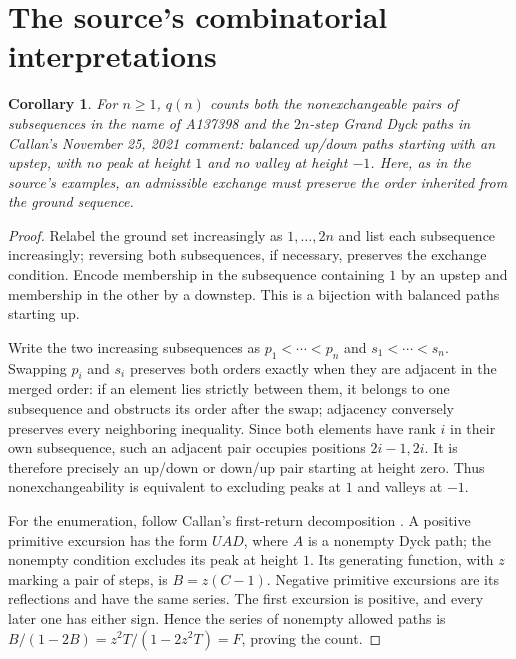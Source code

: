 \documentclass[11pt]{article}
\newtheorem{corollary}[theorem]{Corollary}
\begin{document}
\section{The source's combinatorial interpretations}
\begin{corollary}\label{paths}
For $n\geq1$, $q(n)$ counts both the nonexchangeable pairs of
subsequences in the name of A137398 and the $2n$-step Grand Dyck paths
in Callan's November 25, 2021 comment: balanced up/down paths starting
with an upstep, with no peak at height $1$ and no valley at height $-1$.
Here, as in the source's examples, an admissible exchange must preserve
the order inherited from the ground sequence.
\end{corollary}
\begin{proof}
Relabel the ground set increasingly as $1,\ldots,2n$ and list each
subsequence increasingly; reversing both subsequences, if necessary,
preserves the exchange condition. Encode membership in the subsequence
containing $1$ by an upstep and membership in the other by a downstep.
This is a bijection with balanced paths starting up.

Write the two increasing subsequences as $p_1<\cdots<p_n$ and
$s_1<\cdots<s_n$. Swapping $p_i$ and $s_i$ preserves both orders
exactly when they are adjacent in the merged order: if an element lies
strictly between them, it belongs to one subsequence and obstructs its
order after the swap; adjacency conversely preserves every neighboring
inequality. Since both elements have rank $i$ in their own subsequence,
such an adjacent pair occupies positions $2i-1,2i$. It is therefore
precisely an up/down or down/up pair starting at height zero. Thus
nonexchangeability is equivalent to excluding peaks at $1$ and valleys
at $-1$.

For the enumeration, follow Callan's first-return decomposition
\cite{source}. A positive primitive excursion has the form $UAD$,
where $A$ is a nonempty Dyck path; the nonempty condition excludes its
peak at height $1$. Its generating function, with $z$ marking a pair
of steps, is $B=z(C-1)$. Negative primitive excursions are its
reflections and have the same series. The first excursion is positive,
and every later one has either sign. Hence the series of nonempty
allowed paths is $B/(1-2B)=z^2T/(1-2z^2T)=F$, proving the count.
\end{proof}
\end{document}
